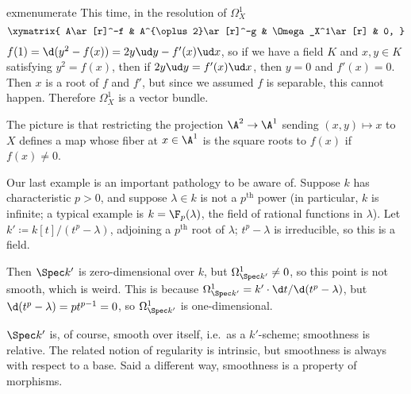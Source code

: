 \begin{comp}{exm}{enumerate}
	This time, in the resolution of $\Omega_X^1$
	\begin{equation}
		\xymatrix{
			A\ar[r]^-f & A^{\oplus 2}\ar[r]^-g & \Omega_X^1\ar[r] & 0,
		}
	\end{equation}
	$f(1) = \d(y^2-f(x)) = 2y\ud y - f'(x)\ud x$, so if we have a field $K$ and $x,y\in K$ satisfying $y^2 = f(x)$,
	then if $2y\ud y = f'(x)\ud x$, then $y = 0$ and $f'(x) = 0$. Then $x$ is a root of $f$ and $f'$, but since we
	assumed $f$ is separable, this cannot happen. Therefore $\Omega_X^1$ is a vector bundle.

	The picture is that restricting the projection $\A^2\to\A^1$ sending $(x,y)\mapsto x$ to $X$ defines a map
	whose fiber at $x\in\A^1$ is the square roots to $f(x)$ if $f(x)\ne 0$.
	\item Our last example is an important pathology to be aware of. Suppose $k$ has characteristic $p > 0$, and
	suppose $\lambda\in k$ is not a $p^{\mathrm{th}}$ power (in particular, $k$ is infinite; a typical example is
	$k = \F_p(\lambda)$, the field of rational functions in $\lambda$). Let $k'\coloneqq k[t]/(t^p-\lambda)$,
	adjoining a $p^{\mathrm{th}}$ root of $\lambda$; $t^p-\lambda$ is irreducible, so this is a field.

	Then $\Spec k'$ is zero-dimensional over $k$, but $\Omega_{\Spec k'}^1\ne 0$, so this point is not smooth,
	which is weird. This is because $\Omega_{\Spec k'}^1 = k'\cdot\d t/\d(t^p-\lambda)$, but $\d(t^p-\lambda) =
	pt^{p-1} = 0$, so $\Omega_{\Spec k'}^1$ is one-dimensional.

	$\Spec k'$ is, of course, smooth over itself, i.e.\ as a $k'$-scheme; smoothness is relative. The related
	notion of regularity is intrinsic, but smoothness is always with respect to a base. Said a different way,
	smoothness is a property of morphisms.
	\qedhere
\end{comp}

